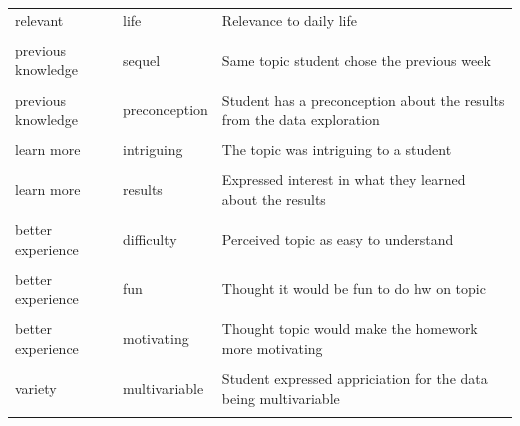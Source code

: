 \documentclass[
  letterpaper,
  DIV=11,
  numbers=noendperiod]{scrartcl}
\begin{document}
\begin{longtable}[t]{>{\raggedright\arraybackslash}p{1in}>{\raggedright\arraybackslash}p{1in}>{\raggedright\arraybackslash}p{4in}}
\addlinespace
relevant & life & Relevance to daily life\\
\cellcolor{gray!10}{previous knowledge} & \cellcolor{gray!10}{familiar} & \cellcolor{gray!10}{Familiar with / knowledgable about topic}\\
previous knowledge & sequel & Same topic student chose the previous week\\
\cellcolor{gray!10}{previous knowledge} & \cellcolor{gray!10}{predictable} & \cellcolor{gray!10}{Student felt topic/results would be predictable}\\
previous knowledge & preconception & Student has a preconception about the results from the data exploration\\
\addlinespace
\cellcolor{gray!10}{previous knowledge} & \cellcolor{gray!10}{unclear} & \cellcolor{gray!10}{Student felt unclear about what the context was}\\
learn more & intriguing & The topic was intriguing to a student\\
\cellcolor{gray!10}{learn more} & \cellcolor{gray!10}{curious} & \cellcolor{gray!10}{Curious to learn more about topic through homework}\\
learn more & results & Expressed interest in what they learned about the results\\
\cellcolor{gray!10}{learn more} & \cellcolor{gray!10}{surprise} & \cellcolor{gray!10}{Student expressed they were surprised by results}\\
\addlinespace
better experience & difficulty & Perceived topic as easy to understand\\
\cellcolor{gray!10}{better experience} & \cellcolor{gray!10}{pace} & \cellcolor{gray!10}{Student thought homework would take less time with the topic}\\
better experience & fun & Thought it would be fun to do hw on topic\\
\cellcolor{gray!10}{better experience} & \cellcolor{gray!10}{engaging} & \cellcolor{gray!10}{Thought topic would make homework more engaging}\\
better experience & motivating & Thought topic would make the homework more motivating\\
\addlinespace
\cellcolor{gray!10}{variety} & \cellcolor{gray!10}{different} & \cellcolor{gray!10}{Different from topics commonly discussed in class}\\
variety & multivariable & Student expressed appriciation for the data being multivariable\\
\cellcolor{gray!10}{random} & \cellcolor{gray!10}{random} & \cellcolor{gray!10}{Random choice}\\

\end{longtable}
\end{document}
